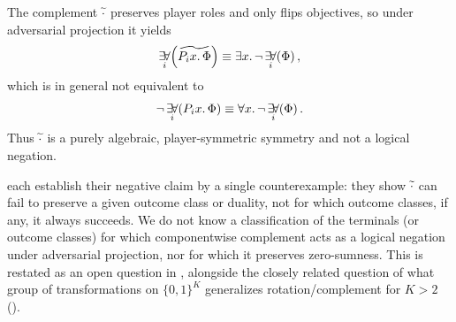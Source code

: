 \begin{remark}
\label{rem:no-global-de-morgan-duality}
The complement $\widetilde{\cdot}$ preserves player roles and only flips objectives, so under adversarial projection it yields
\[
\mathop{\exists\!\forall}_{i}\!\left(\widetilde{P_i x.\,\Phi}\right)
  \equiv \exists x.\,\neg \mathop{\exists\!\forall}_{i}\!\left(\Phi\right),
\]
which is in general not equivalent to
\[
\neg \mathop{\exists\!\forall}_{i}\!\left(P_i x.\,\Phi\right) \equiv \forall x.\,\neg \mathop{\exists\!\forall}_{i}\!\left(\Phi\right).
\]
Thus $\widetilde{\cdot}$ is a purely algebraic, player-symmetric symmetry and not a logical negation.
\end{remark}

\begin{remark}
\label{rem:no-classification}
 each establish their negative claim
by a single counterexample: they show $\widetilde{\cdot}$ can fail to preserve a given outcome class or duality,
not for which outcome classes, if any, it always succeeds. We do not know a classification of the
terminals (or outcome classes) for which componentwise complement acts as a logical negation under
adversarial projection, nor for which it preserves zero-sumness. This is restated as an open question
in , alongside the closely related question of what group of transformations on
$\{0,1\}^K$ generalizes rotation/complement for $K>2$ ().
\end{remark}

